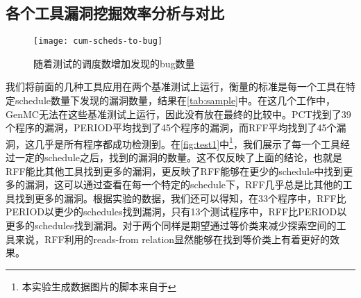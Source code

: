 \subsection{各个工具漏洞挖掘效率分析与对比}

\begin{figure}[ht]
    \centering
    \texttt{[image: cum-scheds-to-bug]}
    \caption{\label{fig:test1}随着测试的调度数增加发现的bug数量}
\end{figure}

我们将前面的几种工具应用在两个基准测试上运行，衡量的标准是每一个工具在特定schedule数量下发现的漏洞数量，结果在\autoref{tab:sample}中。在这几个工作中，GenMC无法在这些基准测试上运行，因此没有放在最终的比较中。PCT找到了39个程序的漏洞，PERIOD平均找到了45个程序的漏洞，而RFF平均找到了45个漏洞，这几乎是所有程序都成功检测到。在\autoref{fig:test1}中\footnote{本实验生成数据图片的脚本来自于\cite{wolff2024greybox}}，我们展示了每一个工具经过一定的schedule之后，找到的漏洞的数量。这不仅反映了上面的结论，也就是RFF能比其他工具找到更多的漏洞，更反映了RFF能够在更少的schedule中找到更多的漏洞，这可以通过查看在每一个特定的schedule下，RFF几乎总是比其他的工具找到更多的漏洞。根据实验的数据，我们还可以得知，在33个程序中，RFF比PERIOD以更少的schedules找到漏洞，只有13个测试程序中，RFF比PERIOD以更多的schedules找到漏洞。对于两个同样是期望通过等价类来减少探索空间的工具来说，RFF利用的reads-from relation显然能够在找到等价类上有着更好的效果。



